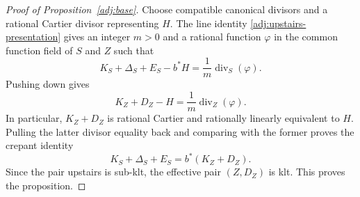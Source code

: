 \begin{proof}[Proof of Proposition~\ref{adj:base}]
Choose compatible canonical divisors and a rational Cartier divisor
representing $H$.  The line identity
\eqref{adj:upstairs-presentation} gives an integer $m>0$ and a rational
function $\varphi$ in the common function field of $S$ and $Z$ such that
\[
 K_S+\Delta_S+E_S-b^*H=\frac1m\operatorname{div}_S(\varphi).
\]
Pushing down gives
\[
 K_Z+D_Z-H=\frac1m\operatorname{div}_Z(\varphi).
\]
In particular, $K_Z+D_Z$ is rational Cartier and rationally linearly
equivalent to $H$.  Pulling the latter divisor equality back and
comparing with the former proves the crepant identity
\[
                 K_S+\Delta_S+E_S=b^*(K_Z+D_Z).
\]
Since the pair upstairs is sub-klt, the effective pair $(Z,D_Z)$ is klt.
This proves the proposition.
\end{proof}
